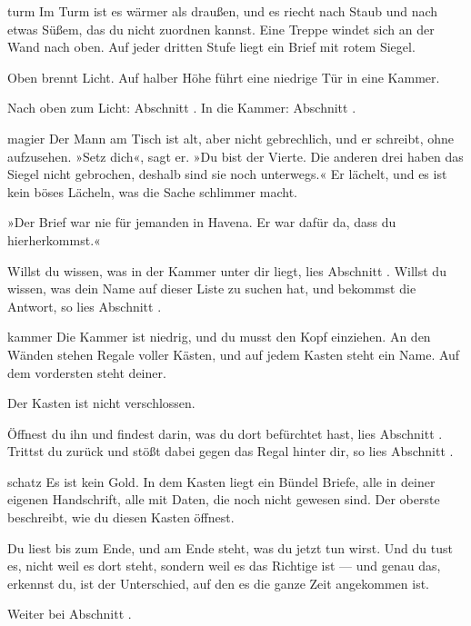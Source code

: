 \begin{soloBlock}{turm}
Im Turm ist es wärmer als draußen, und es riecht nach Staub und nach etwas Süßem,
das du nicht zuordnen kannst. Eine Treppe windet sich an der Wand nach oben. Auf
jeder dritten Stufe liegt ein Brief mit rotem Siegel.

Oben brennt Licht. Auf halber Höhe führt eine niedrige Tür in eine Kammer.

Nach oben zum Licht: Abschnitt . In die Kammer: Abschnitt
.
\end{soloBlock}

\begin{soloBlock}{magier}
Der Mann am Tisch ist alt, aber nicht gebrechlich, und er schreibt, ohne aufzusehen.
»Setz dich«, sagt er. »Du bist der Vierte. Die anderen drei haben das Siegel nicht
gebrochen, deshalb sind sie noch unterwegs.« Er lächelt, und es ist kein böses
Lächeln, was die Sache schlimmer macht.

»Der Brief war nie für jemanden in Havena. Er war dafür da, dass du hierherkommst.«

Willst du wissen, was in der Kammer unter dir liegt, lies Abschnitt
. Willst du wissen, was dein Name auf dieser Liste zu suchen hat,
und bekommst die Antwort, so lies Abschnitt .
\end{soloBlock}

\begin{soloBlock}{kammer}
Die Kammer ist niedrig, und du musst den Kopf einziehen. An den Wänden stehen Regale
voller Kästen, und auf jedem Kasten steht ein Name. Auf dem vordersten steht deiner.

Der Kasten ist nicht verschlossen.

Öffnest du ihn und findest darin, was du dort befürchtet hast, lies Abschnitt
. Trittst du zurück und stößt dabei gegen das Regal hinter dir,
so lies Abschnitt .
\end{soloBlock}

\begin{soloBlock}{schatz}
Es ist kein Gold. In dem Kasten liegt ein Bündel Briefe, alle in deiner eigenen
Handschrift, alle mit Daten, die noch nicht gewesen sind. Der oberste beschreibt,
wie du diesen Kasten öffnest.

Du liest bis zum Ende, und am Ende steht, was du jetzt tun wirst. Und du tust es,
nicht weil es dort steht, sondern weil es das Richtige ist — und genau das, erkennst
du, ist der Unterschied, auf den es die ganze Zeit angekommen ist.

Weiter bei Abschnitt .
\end{soloBlock}

